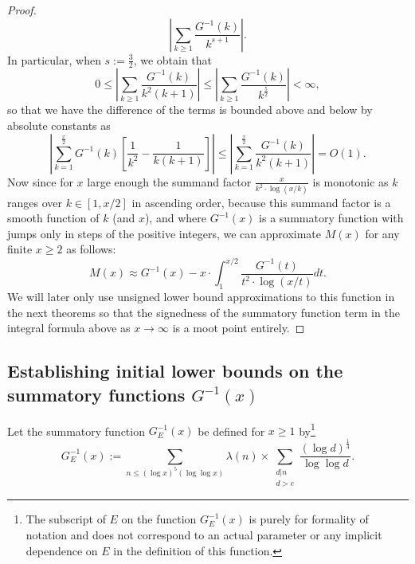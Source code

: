 \documentclass[11pt,reqno,a4letter]{article}
\numberwithin{figure}{section}
\numberwithin{table}{section}
\theoremstyle{plain}
\numberwithin{theorem}{section}
\theoremstyle{definition}
\begin{document}
\begin{proof}
\[     \left\lvert \sum_{k \geq 1} \frac{G^{-1}(k)}{k^{s+1}} \right\rvert. 
\]
In particular, when $s := \frac{3}{2}$, we obtain that 
\[
0 \leq \left\lvert \sum_{k \geq 1} \frac{G^{-1}(k)}{k^{2} (k+1)} \right\rvert \leq 
     \left\lvert \sum_{k \geq 1} \frac{G^{-1}(k)}{k^{\frac{5}{2}}} \right\rvert < \infty, 
\]
so that we have the difference of the terms is bounded above and below by absolute constants as 
\[
\left\lvert \sum_{k=1}^{\frac{x}{2}} G^{-1}(k) \left[\frac{1}{k^2} - \frac{1}{k(k+1)}\right] \right\rvert \leq 
     \left\lvert\sum_{k=1}^{\frac{x}{2}} \frac{G^{-1}(k)}{k^2 (k+1)} \right\rvert = O(1). 
\]
Now since for $x$ large enough the summand factor $\frac{x}{k^2 \cdot \log(x/k)}$ 
is monotonic as $k$ ranges over $k \in [1, x/2]$ in ascending order, because this 
summand factor is a smooth function of $k$ (and $x$), and where $G^{-1}(x)$ is 
a summatory function with jumps only in steps of the positive integers, we can approximate 
$M(x)$ for any finite $x \geq 2$ as follows: 
\[
M(x) \approx G^{-1}(x) - x \cdot \int_1^{x/2} \frac{G^{-1}(t)}{t^2 \cdot \log(x/t)} dt. 
\]
We will later only use unsigned lower bound approximations to this function in the next theorems so that 
the signedness of the summatory function term in the integral formula above 
as $x \rightarrow \infty$ is a moot point entirely. 
\end{proof} 

\subsection{Establishing initial lower bounds on the summatory functions $G^{-1}(x)$} 
\label{Section_ProofOfValidityOfAverageOrderLowerBounds} 

Let the summatory function $G_E^{-1}(x)$ be defined for $x \geq 1$ by\footnote{ 
     The subscript of $E$ 
     on the function $G_E^{-1}(x)$ is purely for formality of 
     notation and does not correspond to 
     an actual parameter or any implicit dependence on $E$ in the 
     definition of this function. 
}
\begin{equation} 
\label{eqn_GEInvxSummatoryFuncDef_v1} 
G_E^{-1}(x) := \sum_{n \leq (\log x)^{5} (\log\log x)} \lambda(n) \times 
     \sum_{\substack{d|n \\ d > e}} \frac{(\log d)^{\frac{1}{4}}}{\log\log d}. 
\end{equation} 
\end{document}
